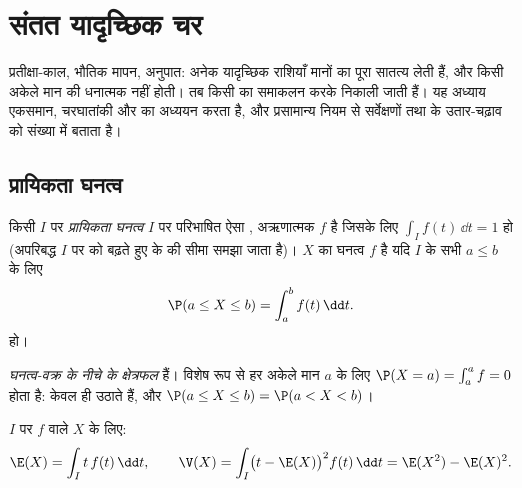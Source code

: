 \chapter{संतत यादृच्छिक चर}\label{ch:g12:contdist}

प्रतीक्षा-काल, भौतिक मापन, अनुपात: अनेक यादृच्छिक राशियाँ मानों का पूरा
सातत्य लेती हैं, और किसी अकेले मान की  धनात्मक नहीं होती। तब
 किसी \emph{} का समाकलन करके निकाली जाती हैं। यह अध्याय
एकसमान, चरघातांकी और  का अध्ययन करता है, और प्रसामान्य नियम
से सर्वेक्षणों तथा  के उतार-चढ़ाव को संख्या में बताता है।

\section{प्रायिकता घनत्व}

\begin{definition}[घनत्व, संतत यादृच्छिक चर]\label{def:g12:contdist:density}
किसी  $I$ पर \emph{प्रायिकता घनत्व} $I$ पर परिभाषित ऐसा
, अऋणात्मक  $f$ है जिसके लिए $\int_I f(t)\,\dd t = 1$ हो (अपरिबद्ध $I$ पर  को बढ़ते
हुए   के  की सीमा समझा जाता है)।  $X$ का
घनत्व $f$ है यदि $I$ के सभी $a \leq b$ के लिए
\[
\P(a \leq X \leq b) = \int_a^b f(t)\,\dd t .
\]
हो।
\end{definition}

 \emph{घनत्व-वक्र के नीचे के क्षेत्रफल} हैं। विशेष रूप से हर अकेले
मान $a$ के लिए $\P(X = a) = \int_a^a f = 0$ होता है: केवल  ही  उठाते हैं, और $\P(a \leq X \leq b) = \P(a < X < b)$।

\begin{definition}[प्रत्याशा और प्रसरण]\label{def:g12:contdist:exp}
$I$ पर  $f$ वाले $X$ के लिए:
\[
\E(X) = \int_I t\,f(t)\,\dd t, \qquad
\V(X) = \int_I \bigl(t - \E(X)\bigr)^2 f(t)\,\dd t
= \E(X^2) - \E(X)^2 .
\]
\end{definition}


